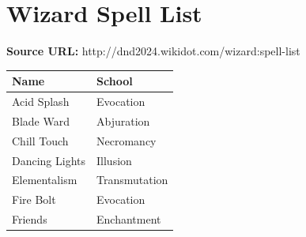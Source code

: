 \documentclass{article}
\begin{document}

\section*{ Wizard Spell List }

\textbf{Source URL:} http://dnd2024.wikidot.com/wizard:spell-list

\vspace{1em}




{\small
\renewcommand{\arraystretch}{1.2}

\begin{tabular}{|p{}|p{}|}
\hline


Name & School \\
\hline

Acid Splash & Evocation \\
\hline

Blade Ward & Abjuration \\
\hline

Chill Touch & Necromancy \\
\hline

Dancing Lights & Illusion \\
\hline

Elementalism & Transmutation \\
\hline

Fire Bolt & Evocation \\
\hline

Friends & Enchantment \\
\hline


\end{tabular}
}

\vspace{1em}






\end{document}
